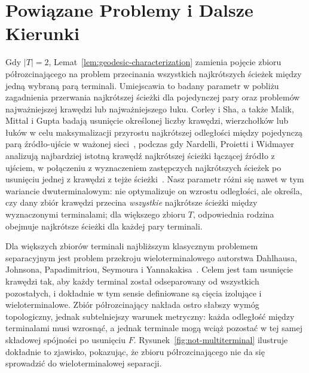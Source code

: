 \documentclass[11pt,a4paper]{amsart}
\theoremstyle{definition}
\theoremstyle{plain}
\begin{document}
\section{Powiązane Problemy i Dalsze Kierunki}\label{sec:related}

Gdy $|T|=2$, Lemat~\ref{lem:geodesic-characterization} zamienia pojęcie zbioru półrozcinającego na problem przecinania wszystkich najkrótszych ścieżek między jedną wybraną parą terminali. Umiejscawia to badany parametr w pobliżu zagadnienia przerwania najkrótszej ścieżki dla pojedynczej pary oraz problemów najważniejszej krawędzi lub najważniejszego łuku.
Corley i Sha, a także Malik, Mittal i Gupta badają usunięcie określonej liczby krawędzi, wierzchołków lub łuków w celu maksymalizacji przyrostu najkrótszej odległości między pojedynczą parą źródło-ujście w ważonej sieci~\cite{corley-sha,malik-mittal-gupta}, podczas gdy Nardelli, Proietti i Widmayer analizują najbardziej istotną krawędź najkrótszej ścieżki łączącej źródło z ujściem, w połączeniu z wyznaczeniem zastępczych najkrótszych ścieżek po usunięciu jednej z krawędzi z tejże ścieżki~\cite{nardelli-proietti-widmayer}. Nasz parametr różni się nawet w tym wariancie dwuterminalowym: nie optymalizuje on wzrostu odległości, ale określa, czy dany zbiór krawędzi przecina \emph{wszystkie} najkrótsze ścieżki między wyznaczonymi terminalami; dla większego zbioru $T$, odpowiednia rodzina obejmuje najkrótsze ścieżki dla każdej pary terminali.

Dla większych zbiorów terminali najbliższym klasycznym problemem separacyjnym jest problem przekroju wieloterminalowego autorstwa Dahlhausa, Johnsona, Papadimitriou, Seymoura i Yannakakisa~\cite{dahlhaus1994}. Celem jest tam usunięcie krawędzi tak, aby każdy terminal został odseparowany od wszystkich pozostałych, i dokładnie w tym sensie definiowane są cięcia izolujące i wieloterminalowe. Zbiór półrozcinający nakłada ostro słabszy wymóg topologiczny, jednak subtelniejszy warunek metryczny: każda odległość między terminalami musi wzrosnąć, a jednak terminale mogą wciąż pozostać w tej samej składowej spójności po usunięciu $F$. Rysunek~\ref{fig:not-multiterminal} ilustruje dokładnie to zjawisko, pokazując, że zbioru półrozcinającego nie da się sprowadzić do wieloterminalowej separacji.
\end{document}
